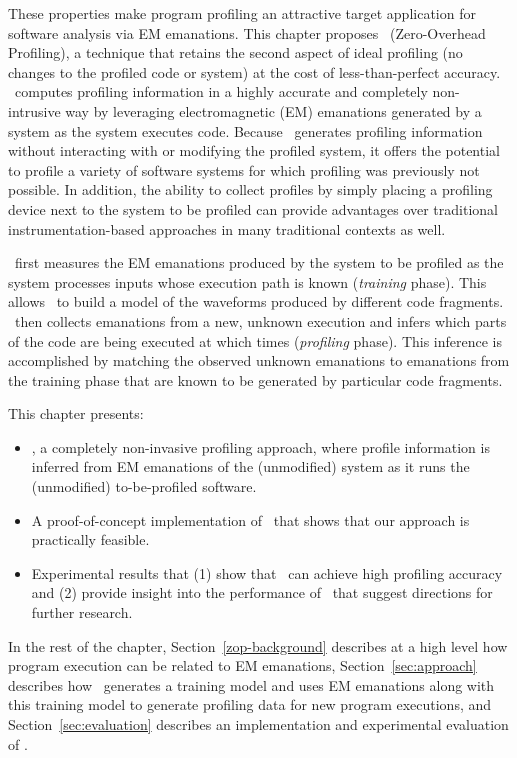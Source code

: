 These properties make program profiling an attractive target application for software analysis via EM emanations. This chapter proposes \zop\ (Zero-Overhead Profiling), a technique that retains the second aspect of ideal profiling (no changes to the profiled code or system) at the cost of less-than-perfect accuracy. \zop\ computes profiling information in a highly accurate and completely non-intrusive way by leveraging electromagnetic (EM) emanations generated by a system as the system executes code. Because \zop\ generates profiling information without interacting with or modifying the profiled system, it offers the potential to profile a variety of software systems for which profiling was previously not possible. In addition, the ability to collect profiles by simply placing a profiling device next to the system to be profiled can provide advantages over traditional instrumentation-based approaches in many traditional contexts as well.

\zop\ first measures the EM emanations produced by the system to be profiled as the system processes inputs whose execution path is known (\textit{training} phase). This allows \zop\ to build a model of the waveforms produced by different code fragments. \zop\ then collects emanations from a new, unknown execution and infers which parts of the code are being executed at which times (\textit{profiling} phase). This inference is accomplished by matching the observed unknown emanations to emanations from the training phase that are known to be generated by particular code fragments.

This chapter presents:
\begin{itemize}
\item \zop, a completely non-invasive profiling approach, where profile information is inferred from EM emanations of the (unmodified) system as it runs the (unmodified) to-be-profiled software.
\item A proof-of-concept implementation of \zop\ that shows that our approach is practically feasible.
\item Experimental results that (1) show that \zop\ can achieve high profiling accuracy and (2) provide insight into the performance of \zop\ that suggest directions for further research.
\end{itemize}

In the rest of the chapter, Section~\ref{zop-background} describes at a high level how program execution can be related to EM emanations, Section~\ref{sec:approach} describes how \zop\ generates a training model and uses EM emanations along with this training model to generate profiling data for new program executions, and Section~\ref{sec:evaluation} describes an implementation and experimental evaluation of \zop.
